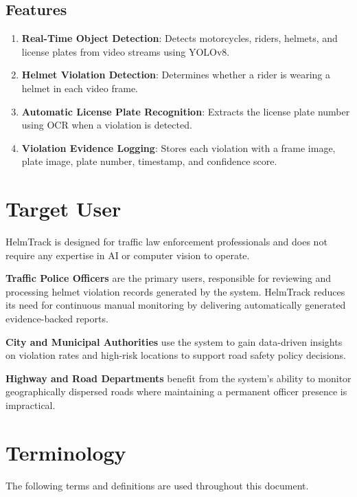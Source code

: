 \subsection{Features}
\label{subsection:features}

\begin{enumerate}[leftmargin=80pt]
    \item \textbf{Real-Time Object Detection}: Detects motorcycles, riders, helmets, and license plates from video streams using YOLOv8.
    \item \textbf{Helmet Violation Detection}: Determines whether a rider is wearing a helmet in each video frame.
    \item \textbf{Automatic License Plate Recognition}: Extracts the license plate number using OCR when a violation is detected.
    \item \textbf{Violation Evidence Logging}: Stores each violation with a frame image, plate image, plate number, timestamp, and confidence score.
\end{enumerate}

\section{Target User}
\label{section:target-user}

HelmTrack is designed for traffic law enforcement professionals and does not require any expertise in AI or computer vision to operate.

\textbf{Traffic Police Officers} are the primary users, responsible for reviewing and processing helmet violation records generated by the system. HelmTrack reduces its need for continuous manual monitoring by delivering automatically generated evidence-backed reports.

\textbf{City and Municipal Authorities} use the system to gain data-driven insights on violation rates and high-risk locations to support road safety policy decisions.

\textbf{Highway and Road Departments} benefit from the system's ability to monitor geographically dispersed roads where maintaining a permanent officer presence is impractical.

\section{Terminology}
\label{section:terminology}

The following terms and definitions are used throughout this document.

